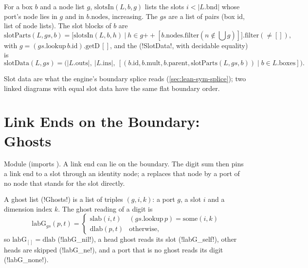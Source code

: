 \begin{definition}\label{def:lean-sym-slotdata}
For a box $b$ and a node list $g$, $\mathrm{slotsIn}(L,b,g)$ lists the slots $i<|L.\mathrm{bnd}|$ whose port's node lies in $g$ and in $b.\mathrm{nodes}$, increasing. The  $gs$ are a list of pairs (box id, list of node lists). The slot blocks of $b$ are
\[
\mathrm{slotParts}(L,gs,b)=\bigl[\mathrm{slotsIn}(L,b,h)\ \big|\ h\in g\mathbin{+\!\!+}[b.\mathrm{nodes.filter}(n\notin\textstyle\bigcup g)]\bigr].\mathrm{filter}(\neq[]),
\]
with $g=(gs.\mathrm{lookup}\,b.\mathrm{id}).\mathrm{getD}\,[]$,
and the  (\lean!SlotData!, with decidable equality) is
\[
\mathrm{slotData}(L,gs)=\bigl(|L.\mathrm{outs}|,\ |L.\mathrm{ins}|,\ [(b.\mathrm{id},b.\mathrm{mult},b.\mathrm{parent},\mathrm{slotParts}(L,gs,b))\mid b\in L.\mathrm{boxes}]\bigr).
\]
\end{definition}

Slot data are what the engine's boundary splice reads (\cref{sec:lean-sym-splice}); two linked diagrams with equal slot data have the same flat boundary order.

\section{Link Ends on the Boundary: Ghosts}\label{sec:lean-sym-ghost}

Module  (imports ). A link end can lie on the boundary. The digit sum then pins a link end to a slot through an identity node; a  replaces that node by a port of no node that stands for the slot directly.

\begin{definition}[Ghosts]
A ghost list (\lean!Ghosts!) is a list of triples $(g,i,k)$: a port $g$, a slot $i$ and a dimension index $k$. The ghost reading of a digit is
\[
\mathrm{labG}_{gs}(p,t)=\begin{cases}\mathrm{slab}(i,t)&(gs.\mathrm{lookup}\,p)=\mathrm{some}(i,k)\\ \mathrm{dlab}(p,t)&\text{otherwise,}\end{cases}
\]
so $\mathrm{labG}_{[]}=\mathrm{dlab}$ (\lean!labG_nil!), a head ghost reads its slot (\lean!labG_self!), other heads are skipped (\lean!labG_ne!), and a port that is no ghost reads its digit (\lean!labG_none!).
\end{definition}

